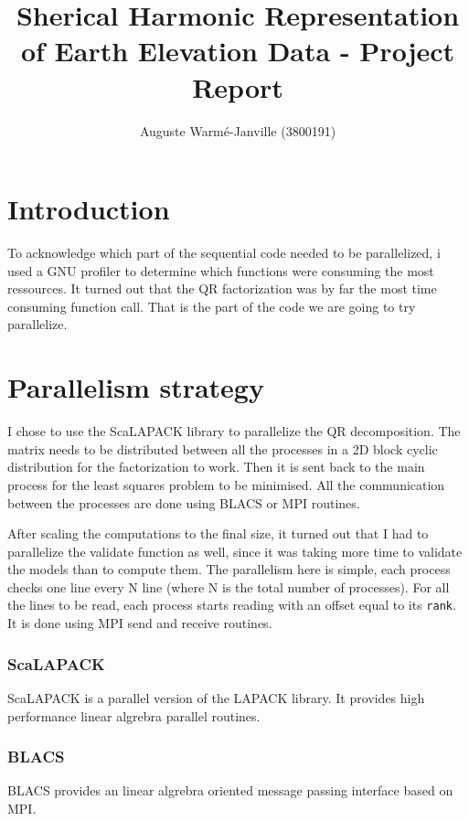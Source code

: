 \documentclass{article}
\begin{document}
\title{Sherical Harmonic Representation of Earth Elevation Data - Project Report}
\author{Auguste Warmé-Janville (3800191)}
\maketitle

\section{Introduction}

\par To acknowledge which part of the sequential code needed to be parallelized, i used a GNU profiler to determine which functions were consuming the most ressources. It turned out that the QR factorization was by far the most time consuming function call. That is the part of the code we are going to try parallelize. 

\section{Parallelism strategy}

\par I chose to use the ScaLAPACK library to parallelize the QR decomposition. The matrix needs to be distributed between all the processes in a 2D block cyclic distribution for the factorization to work. Then it is sent back to the main process for the least squares problem to be minimised. All the communication between the processes are done using BLACS or MPI routines.
\par After scaling the computations to the final size, it turned out that I had to parallelize the validate function as well, since it was taking more time to validate the models than to compute them. The parallelism here is simple, each process checks one line every N line (where N is the total number of processes). For all the lines to be read, each process starts reading with an offset equal to its \verb |rank|. It is done using MPI send and receive routines.

\subsubsection*{ScaLAPACK} 
\par ScaLAPACK is a parallel version of the LAPACK library. It provides high performance linear algrebra parallel routines.

\subsubsection*{BLACS}
\par BLACS provides an linear algrebra oriented message passing interface based on MPI.
\end{document}
